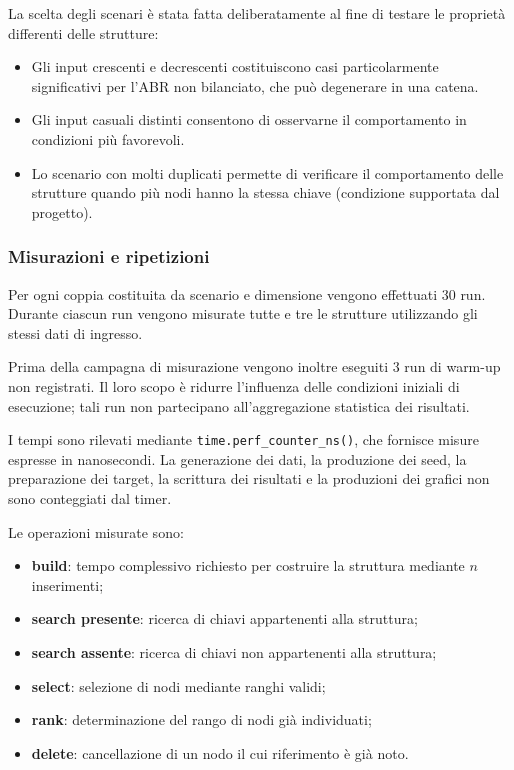 \documentclass[a4paper,11pt]{article}
\begin{document}
La scelta degli scenari è stata fatta deliberatamente al fine di testare le proprietà differenti delle strutture: 
\begin{itemize}
    \item Gli input crescenti e decrescenti costituiscono casi particolarmente significativi per l'ABR non bilanciato, che può degenerare in una catena.
    
    \item  Gli input casuali distinti consentono  di osservarne il comportamento in condizioni più favorevoli.
    
    \item Lo scenario con molti duplicati permette di verificare il comportamento delle strutture quando più nodi hanno la stessa chiave (condizione supportata dal progetto).
\end{itemize}


\subsubsection{Misurazioni e ripetizioni} 
Per ogni coppia costituita da scenario e dimensione vengono effettuati $30$ run. Durante ciascun run vengono misurate tutte e tre le strutture utilizzando gli stessi dati di ingresso.

Prima della campagna di misurazione vengono inoltre eseguiti $3$ run di warm-up non registrati. Il loro scopo è ridurre l'influenza delle condizioni iniziali di esecuzione; tali run non partecipano all'aggregazione statistica dei risultati.

I tempi sono rilevati mediante \texttt{time.perf\_counter\_ns()}, che fornisce misure espresse in nanosecondi. La generazione dei dati, la produzione dei seed, la preparazione dei target, la scrittura dei risultati e la produzioni dei grafici non sono conteggiati dal timer.

Le operazioni misurate sono: 
\begin{itemize}
    \item \textbf{build}: tempo complessivo richiesto per costruire la struttura mediante $n$ inserimenti;
    
    \item \textbf{search presente}: ricerca di chiavi appartenenti alla struttura;
    
    \item \textbf{search assente}: ricerca di chiavi non appartenenti alla struttura;
    
    \item \textbf{select}: selezione di nodi mediante ranghi validi;
    
    \item \textbf{rank}: determinazione del rango di nodi già individuati;
    
    \item \textbf{delete}: cancellazione di un nodo il cui riferimento è già noto.
\end{itemize}
\end{document}
